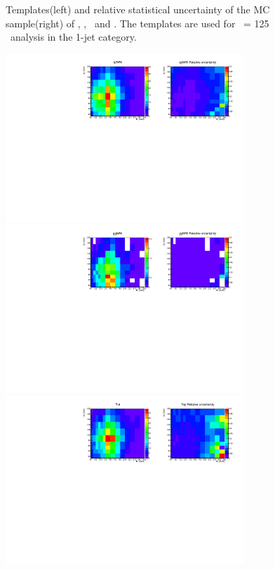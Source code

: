 \begin{figure}[htp]
\caption{Templates(left) and relative statistical uncertainty of the MC sample(right) 
of \qqWH, \qqZH, \qqH\ and \ggH. 
The templates are used for \mHi\ = 125 \GeV\ analysis in the 1-jet category.}
\label{fig:2dtemplate_125_1j_1}
\end{figure}

\begin{figure}[htp]
\centering
\includegraphics[width=0.8\textwidth]{figures/2dtemplate_qqWW_mH125_1j.pdf}
\includegraphics[width=0.8\textwidth]{figures/2dtemplate_ggWW_mH125_1j.pdf}
\includegraphics[width=0.8\textwidth]{figures/2dtemplate_Top_mH125_1j.pdf}

\end{figure}
